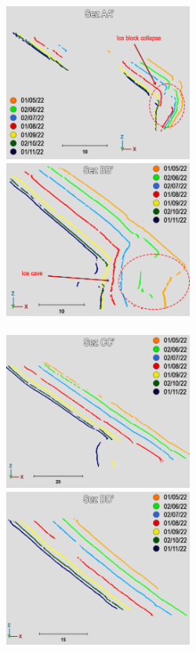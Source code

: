 \begin{figure}
  \begin{center}
    \includegraphics[width=62mm]{4_sec_aa.png} \quad
    \includegraphics[width=62mm]{4_sec_bb.png} \\
     \hspace{62mm}
     \\ \vspace{1mm}
    \includegraphics[width=62mm]{4_sec_cc.png} \quad
    \includegraphics[width=62mm]{4_sec_dd.png} \\

\end{center}
\end{figure}
